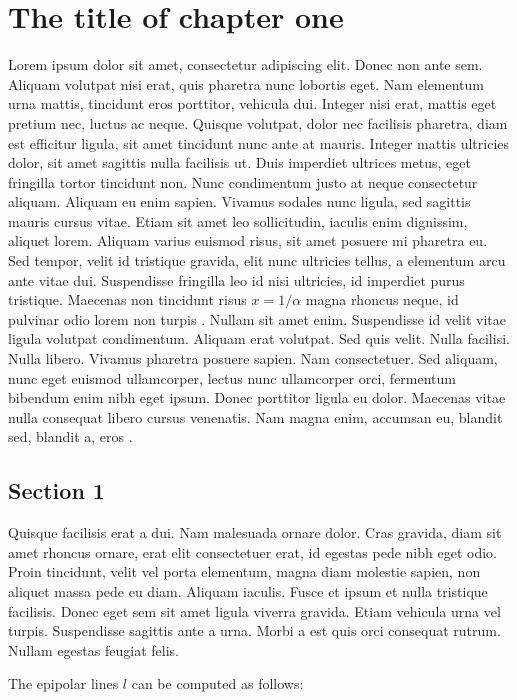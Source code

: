 \chapter{The title of chapter one}

Lorem ipsum dolor sit amet, consectetur adipiscing elit. Donec non ante sem. Aliquam volutpat nisi erat, quis pharetra nunc lobortis eget. Nam elementum urna mattis, tincidunt eros porttitor, vehicula dui. Integer nisi erat, mattis eget pretium nec, luctus ac neque. Quisque volutpat, dolor nec facilisis pharetra, diam est efficitur ligula, sit amet tincidunt nunc ante at mauris. Integer mattis ultricies dolor, sit amet sagittis nulla facilisis ut. Duis imperdiet ultrices metus, eget fringilla tortor tincidunt non. Nunc condimentum justo at neque consectetur aliquam. Aliquam eu enim sapien. Vivamus sodales nunc ligula, sed sagittis mauris cursus vitae. Etiam sit amet leo sollicitudin, iaculis enim dignissim, aliquet lorem. Aliquam varius euismod risus, sit amet posuere mi pharetra eu. Sed tempor, velit id tristique gravida, elit nunc ultricies tellus, a elementum arcu ante vitae dui. Suspendisse fringilla leo id nisi ultricies, id imperdiet purus tristique. Maecenas non tincidunt risus $x = 1/\alpha$ magna rhoncus neque, id pulvinar odio lorem non turpis \cite{brin2012reprint, russell1995artificial}. Nullam sit amet enim. Suspendisse id velit vitae ligula volutpat condimentum. Aliquam erat volutpat. Sed quis velit. Nulla facilisi. Nulla libero. Vivamus pharetra posuere sapien. Nam consectetuer. Sed aliquam, nunc eget euismod ullamcorper, lectus nunc ullamcorper orci, fermentum bibendum enim nibh eget ipsum. Donec porttitor ligula eu dolor. Maecenas vitae nulla consequat libero cursus venenatis. Nam magna enim, accumsan eu, blandit sed, blandit a, eros \cite{google}.

\section{Section 1}
Quisque facilisis erat a dui. Nam malesuada ornare dolor. Cras gravida, diam sit amet rhoncus ornare, erat elit consectetuer erat, id egestas pede nibh eget odio. Proin tincidunt, velit vel porta elementum, magna diam molestie sapien, non aliquet massa pede eu diam. Aliquam iaculis. Fusce et ipsum et nulla tristique facilisis. Donec eget sem sit amet ligula viverra gravida. Etiam vehicula urna vel turpis. Suspendisse sagittis ante a urna. Morbi a est quis orci consequat rutrum. Nullam egestas feugiat felis.

The epipolar lines $l$ can be computed as follows:
